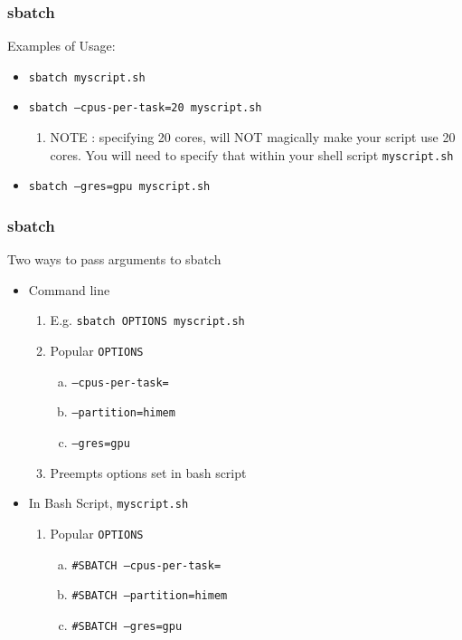 \documentclass{beamer}
\newcommand{\code}[1]{\colorbox{codegray}{\texttt{#1}}}
\begin{document}
\begin{frame}
\frametitle{sbatch}
Examples of Usage:
\bigskip
\begin{itemize}
    \item \code{sbatch myscript.sh}
    \bigskip
    \pause
    \item \code{sbatch --cpus-per-task=20 myscript.sh}
    \bigskip
    \pause
    \begin{enumerate}
        \item NOTE : specifying 20 cores, will NOT magically make your script use 20 cores.
                     You will need to specify that within your shell script \code{myscript.sh}
    \end{enumerate}
    \pause
    \item \code{sbatch --gres=gpu myscript.sh}
    \bigskip
\end{itemize}
\end{frame}



\begin{frame}
\frametitle{sbatch}
Two ways to pass arguments to sbatch
\smallskip
\begin{itemize}
    \item Command line
        \smallskip
        \begin{enumerate}
            \item E.g. \code{sbatch OPTIONS myscript.sh}
            \pause
            \smallskip
            \item Popular \code{OPTIONS}
            \begin{enumerate}[a)]
                \item \code{--cpus-per-task=} 
                \pause
                \smallskip
                \item \code{--partition=himem}
                \pause
                \smallskip
                \item \code{--gres=gpu}
            \end{enumerate}
            \pause
            \smallskip
            \item Preempts options set in bash script
        \end{enumerate}
        \smallskip

    \pause
    \item In Bash Script, \code{myscript.sh}
        \smallskip
        \begin{enumerate}
            \item Popular \code{OPTIONS}
            \begin{enumerate}[a)]
                \item \code{\#SBATCH --cpus-per-task=} 
                \pause
                \smallskip
                \item \code{\#SBATCH --partition=himem}
                \pause
                \smallskip
                \item \code{\#SBATCH --gres=gpu}
            \end{enumerate}
        \end{enumerate}
\end{itemize}
\end{frame}
\end{document}
